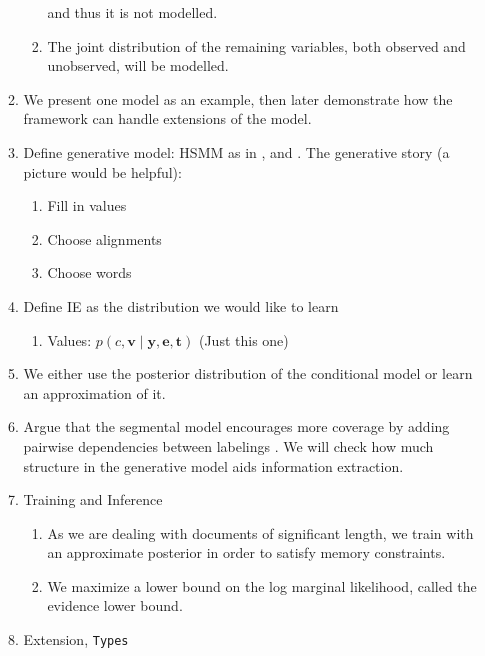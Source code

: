 \documentclass[11pt]{article}
\newcommand{\be}{\mathbf{e}}
\newcommand{\br}{\mathbf{r}}
\newcommand{\bt}{\mathbf{t}}
\newcommand{\bv}{\mathbf{v}}
\newcommand{\by}{\mathbf{y}}
\begin{document}
\begin{enumerate}
\begin{enumerate}
\begin{enumerate}
            and thus it is not modelled.
        \item The joint distribution of the remaining variables,
            both observed and unobserved, will be modelled.
        \end{enumerate}
    \item We present one model as an example, then later demonstrate how the framework
        can handle extensions of the model.
    \item Define generative model: HSMM as in \citep{liang2009semalign},
        and \citep{wiseman2018template}.
        The generative story (a picture would be helpful):
        \begin{enumerate}
        \item Fill in values
        \item Choose alignments
        \item Choose words
        \end{enumerate}
    \item Define IE as the distribution we would like to learn
        \begin{enumerate}
        \item Values: $p(c,\bv\mid\by,\be,\bt)$ (Just this one)
        \end{enumerate}
    \item We either use the posterior distribution of the conditional model
        or learn an approximation of it.
    \item Argue that the segmental model encourages more coverage
        by adding pairwise dependencies between labelings \citep{liang2009semalign}.
        We will check how much structure in the generative model
        aids information extraction.
    \item Training and Inference
        \begin{enumerate}
        \item As we are dealing with documents of significant length,
            we train with an approximate posterior in order to satisfy memory constraints.
        \item We maximize a lower bound on the log marginal likelihood,
            called the evidence lower bound.
        \end{enumerate}
    \item Extension, \texttt{Types}
        \begin{enumerate}

\end{enumerate}
\end{enumerate}
\end{enumerate}
\end{document}
